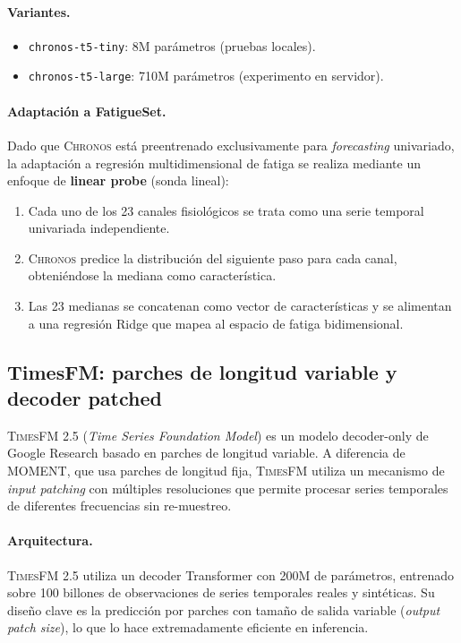 \documentclass[12pt, a4paper]{article}
\newcommand{\code}[1]{\texttt{#1}}
\newcommand{\moment}{\textsc{MOMENT}}
\newcommand{\chronos}{\textsc{Chronos}}
\newcommand{\timesfm}{\textsc{TimesFM}}
\begin{document}
\paragraph{Variantes.}
\begin{itemize}
    \item \code{chronos-t5-tiny}: 8M parámetros (pruebas locales).
    \item \code{chronos-t5-large}: 710M parámetros (experimento en servidor).
\end{itemize}

\paragraph{Adaptación a FatigueSet.}
Dado que \chronos{} está preentrenado exclusivamente para \textit{forecasting} univariado, la adaptación a regresión multidimensional de fatiga se realiza mediante un enfoque de \textbf{linear probe} (sonda lineal):
\begin{enumerate}
    \item Cada uno de los 23 canales fisiológicos se trata como una serie temporal univariada independiente.
    \item \chronos{} predice la distribución del siguiente paso para cada canal, obteniéndose la mediana como característica.
    \item Las 23 medianas se concatenan como vector de características y se alimentan a una regresión Ridge que mapea al espacio de fatiga bidimensional.
\end{enumerate}


\subsection{TimesFM: parches de longitud variable y decoder patched}

\timesfm{} 2.5 (\textit{Time Series Foundation Model}) \cite{das2024timesfm} es un modelo decoder-only de Google Research basado en parches de longitud variable. A diferencia de \moment{}, que usa parches de longitud fija, \timesfm{} utiliza un mecanismo de \textit{input patching} con múltiples resoluciones que permite procesar series temporales de diferentes frecuencias sin re-muestreo.

\paragraph{Arquitectura.}
\timesfm{} 2.5 utiliza un decoder Transformer con 200M de parámetros, entrenado sobre 100 billones de observaciones de series temporales reales y sintéticas. Su diseño clave es la predicción por parches con tamaño de salida variable (\textit{output patch size}), lo que lo hace extremadamente eficiente en inferencia.
\end{document}

